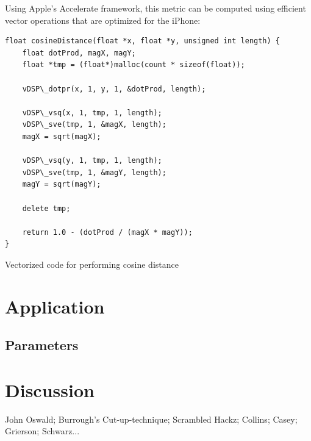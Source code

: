 \documentclass[a4paper,10pt,final]{ThesisStyle}
\begin{document}
Using Apple's Accelerate framework, this metric can be computed using efficient vector operations that are optimized for the iPhone:
\clearpage
\begin{program}
\begin{verbatim}
float cosineDistance(float *x, float *y, unsigned int length) {
	float dotProd, magX, magY;
	float *tmp = (float*)malloc(count * sizeof(float));
	
	vDSP\_dotpr(x, 1, y, 1, &dotProd, length);
	
	vDSP\_vsq(x, 1, tmp, 1, length);
	vDSP\_sve(tmp, 1, &magX, length);
	magX = sqrt(magX);
	
	vDSP\_vsq(y, 1, tmp, 1, length);
	vDSP\_sve(tmp, 1, &magY, length);
	magY = sqrt(magY);
	
	delete tmp;
	
	return 1.0 - (dotProd / (magX * magY));
}
\end{verbatim}
\caption{Vectorized code for performing cosine distance}
\end{program}

\section{Application}

\subsection{Parameters}
\label{subsec:parameters}

\section{Discussion}

John Oswald; Burrough's Cut-up-technique; Scrambled Hackz; Collins; Casey; Grierson; Schwarz...





\end{document}
